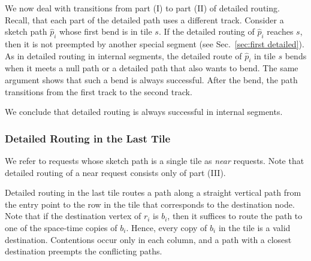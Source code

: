 \documentclass[11pt]{article}
\newenvironment{proof sketch}[1]{\noindent {\emph{Proof sketch of #1:}}}{\hfill \qed}
\begin{document}
We now deal with transitions from part (I) to part (II) of detailed routing.
Recall, that each part of the detailed path uses a different track.
Consider a sketch path $\hat p_i$ whose first bend is in tile $s$.
If the detailed routing of $\hat p_i$ reaches $s$, then it is not preempted by
another special segment (see Sec.~\ref{sec:first detailed}).
As in detailed routing in internal segments, the detailed route of $\hat p_i$ in tile
$s$ bends when it meets a null path or a detailed path that also wants to bend.
The same argument shows that such a bend is always successful.
After the bend, the path transitions from the first track to the second track.

We conclude that detailed routing is always successful in internal
segments.
\begin{comment}
We claim that detailed routing in internal segments is always successful also for
partial tiles.  This is true because straight paths (``rays'') are unblocked in
partial tiles, and if a turn needs to take place, then all $k$ ``crossings'' exist
even if the tile is a partial tile. See Figure~\ref{fig:turn in partial tile} for a depiction of detailed
routing in partial tiles.




\begin{figure}[H]
  \centering
    \texttt{[image: detailedint.eps]}
    \caption{Detailed routing in internal segments for partial tiles. Although the
      tiles are partial, detailed routing works as if the tiles are complete. Two
      prefixes of detailed routing are depicted in the figure by black and grey
      curves. The top path is a first segment and the bottom path bends in a partial
      tile. Note that all possible crossings in the tile in which the bend takes
      place exist in the partial tile.}
\label{fig:turn in partial tile}
\end{figure}

\end{comment}



\subsubsection{Detailed Routing in the Last Tile}
We refer to requests whose sketch path is a single tile as \emph{near} requests.
Note that detailed routing of a near request consists only of part (III).

Detailed routing in the last tile routes a path along a straight vertical path from
the entry point to the row in the tile that corresponds to the destination node.
Note that if the destination vertex of $r_i$ is $b_i$, then it suffices to route the
path to one of the space-time copies of $b_i$. Hence, every copy of $b_i$ in the tile
is a valid destination. Contentions occur only in each column, and a path with a
closest destination preempts the conflicting paths.
\end{document}
